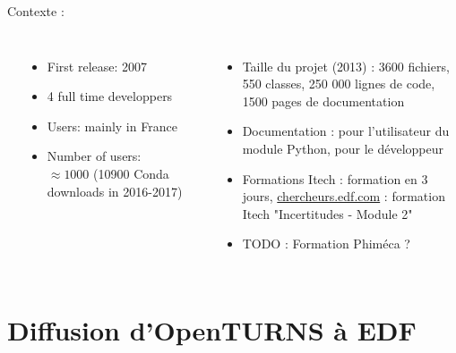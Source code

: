 \documentclass{beamer}
\begin{document}
\begin{frame}[containsverbatim]

Contexte :
  \begin{columns}
\frametitle{\ot{}}
\begin{itemize}
\item First release: 2007
\item 4 full time developpers
\item Users: mainly in France
\item Number of users: $\approx 1000$ (10900 Conda downloads in 2016-2017)
\end{itemize}


\frametitle{\ot{}}
\begin{itemize}
\item Taille du projet (2013) : 3600 fichiers, 550 classes, 250 000 lignes de code, 
1500 pages de documentation
\item Documentation : pour l'utilisateur du module Python, pour le développeur
\item Formations Itech : formation en 3 jours, 
\url{chercheurs.edf.com} : formation Itech "Incertitudes - Module 2"
\item TODO : Formation Phiméca ?
\end{itemize}

	\end{columns}

\end{frame}

\section{Diffusion d'OpenTURNS à EDF}
\end{document}
